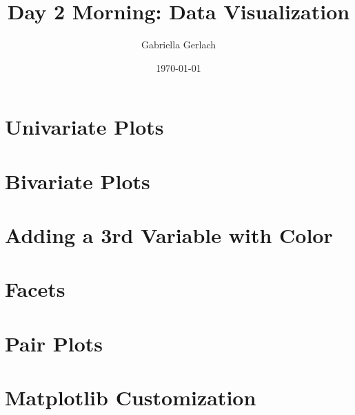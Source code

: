 \documentclass{article}
\title{Day 2 Morning: Data Visualization}
\author{Gabriella Gerlach}
\date{\today}
\begin{document}
\maketitle
\section{Univariate Plots}

\section{Bivariate Plots}

\section{Adding a 3rd Variable with Color}

\section{Facets}

\section{Pair Plots}

\section{Matplotlib Customization}
\end{document}
